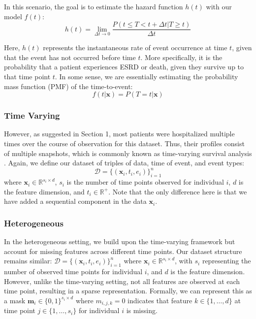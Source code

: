 In this scenario, the goal is to estimate the hazard function $h(t)$ with our model $f(t)$:
$$h(t) = \lim_{\Delta t \to 0} \frac{P(t \leq T < t + \Delta t | T \geq t)}{\Delta t}$$

Here, $h(t)$ represents the instantaneous rate of event occurrence at time $t$, given that the event has not occurred before time $t$. More specifically, it is the probability that a patient experiences ESRD or death, given they survive up to that time point $t$. In some sense, we are essentially estimating the probability mass function (PMF) of the time-to-event:
$$f(t | \boldsymbol{x}) = P(T = t | \boldsymbol{x})$$

\subsubsection{Time Varying}
However, as suggested in Section 1, most patients were hospitalized multiple times over the course of observation for this dataset. Thus, their profiles consist of multiple snapshots, which is commonly known as time-varying survival analysis \cite{zhang2018time_variant_surv_analysis}. Again, we define our dataset of triples of data, time of event, and event types:
$$\mathcal{D} = \{(\boldsymbol{x}_i, t_i, e_i)\}_{i=1}^n$$
where $\boldsymbol{x}_i \in \mathbb{R}^{s_i \times d}$, $s_i$ is the number of time points observed for individual $i$, $d$ is the feature dimension, and $t_i \in \mathbb{R}^+$. Note that the only difference here is that we have added a sequential component in the data $\boldsymbol{x}_i$.

\subsubsection{Heterogeneous} \label{sec: Heterogeneous}
In the heterogeneous setting, we build upon the time-varying framework but account for missing features across different time points. Our dataset structure remains similar:
$\mathcal{D} = \{(\boldsymbol{x}_i, t_i, e_i)\}_{i=1}^n$
where $\boldsymbol{x}_i \in \mathbb{R}^{s_i \times d}$, with $s_i$ representing the number of observed time points for individual $i$, and $d$ is the feature dimension. However, unlike the time-varying setting, not all features are observed at each time point, resulting in a sparse representation. Formally, we can represent this as a mask $\boldsymbol{m}_i \in \{0,1\}^{s_i \times d}$ where $m_{i,j,k} = 0$ indicates that feature $k \in \{1, \dots, d\}$ at time point $j \in \{1, \dots, s_i\}$ for individual $i$ is missing.

